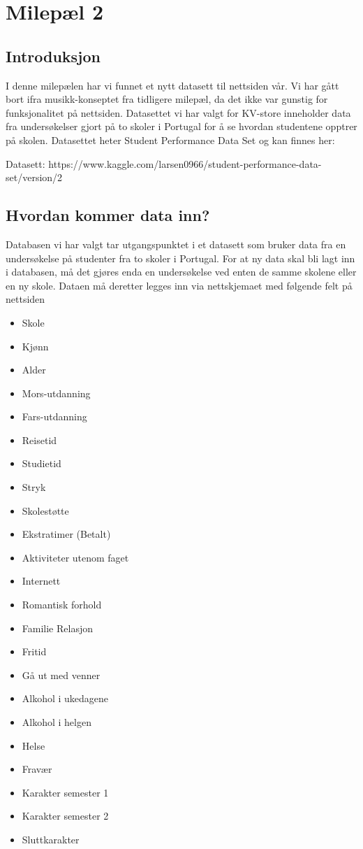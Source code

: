 \section{Milepæl 2}
\subsection{Introduksjon}
I denne milepælen har vi funnet et nytt datasett til nettsiden vår. Vi har gått bort ifra musikk-konseptet fra tidligere milepæl, da det ikke var gunstig for funksjonalitet på nettsiden. Datasettet vi har valgt for KV-store inneholder data fra undersøkelser gjort på to skoler i Portugal for å se hvordan studentene opptrer på skolen. Datasettet heter Student Performance Data Set og kan finnes her:

Datasett: https://www.kaggle.com/larsen0966/student-performance-data-set/version/2

\subsection{Hvordan kommer data inn?}
Databasen vi har valgt tar utgangspunktet i et datasett som bruker data fra en undersøkelse på studenter fra to skoler i Portugal. For at ny data skal bli lagt inn i databasen, må det gjøres enda en undersøkelse ved enten de samme skolene eller en ny skole. Dataen må deretter legges inn via nettskjemaet med følgende felt på nettsiden

\begin{itemize}
  \item Skole
  \item Kjønn
  \item Alder
  \item Mors-utdanning
  \item Fars-utdanning
  \item Reisetid
  \item Studietid
  \item Stryk
  \item Skolestøtte
  \item Ekstratimer (Betalt)
  \item Aktiviteter utenom faget
  \item Internett
  \item Romantisk forhold
  \item Familie Relasjon
  \item Fritid
  \item Gå ut med venner
  \item Alkohol i ukedagene
  \item Alkohol i helgen
  \item Helse
  \item Fravær
  \item Karakter semester 1
  \item Karakter semester 2
  \item Sluttkarakter
\end{itemize}

